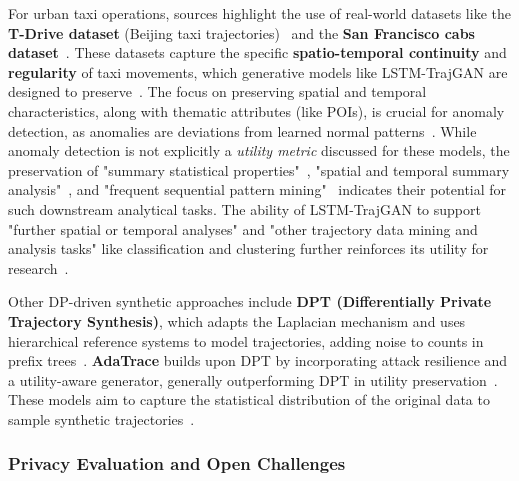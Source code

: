 \documentclass[runningheads]{llncs}
\begin{document}
For urban taxi operations, sources highlight the use of real-world datasets like the \textbf{T-Drive dataset} (Beijing taxi trajectories)~\cite{Ma2021TrajectoryPrivacy,Primault2014DPLPP,Primault2019LongRoad} and the \textbf{San Francisco cabs dataset}~\cite{Primault2014DPLPP,Primault2019LongRoad}. These datasets capture the specific \textbf{spatio-temporal continuity} and \textbf{regularity} of taxi movements, which generative models like LSTM-TrajGAN are designed to preserve~\cite{Rao2021LSTMTrajGAN,Liu2018TrajGANs,Jin2023SurveyExpStudy}. The focus on preserving spatial and temporal characteristics, along with thematic attributes (like POIs), is crucial for anomaly detection, as anomalies are deviations from learned normal patterns~\cite{Rao2021LSTMTrajGAN,Naghizade2020PrivacyContextAware}. While anomaly detection is not explicitly a \textit{utility metric} discussed for these models, the preservation of "summary statistical properties"~\cite{Liu2018TrajGANs}, "spatial and temporal summary analysis"~\cite{Rao2021LSTMTrajGAN,Chen2011DPTP}, and "frequent sequential pattern mining"~\cite{Chen2011DPTP} indicates their potential for such downstream analytical tasks. The ability of LSTM-TrajGAN to support "further spatial or temporal analyses" and "other trajectory data mining and analysis tasks" like classification and clustering further reinforces its utility for research~\cite{Rao2021LSTMTrajGAN,Chen2011DPTP}.

Other DP-driven synthetic approaches include \textbf{DPT (Differentially Private Trajectory Synthesis)}, which adapts the Laplacian mechanism and uses hierarchical reference systems to model trajectories, adding noise to counts in prefix trees~\cite{Chen2011DPTP,Jin2023SurveyExpStudy}. \textbf{AdaTrace} builds upon DPT by incorporating attack resilience and a utility-aware generator, generally outperforming DPT in utility preservation~\cite{Jin2023SurveyExpStudy}. These models aim to capture the statistical distribution of the original data to sample synthetic trajectories~\cite{Jin2023SurveyExpStudy,Qu2020GANs5G}.

\subsubsection{Privacy Evaluation and Open Challenges}
\end{document}
